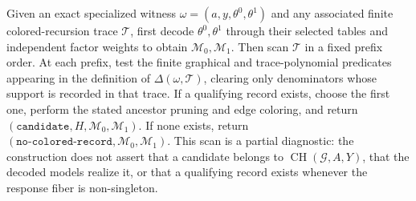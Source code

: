 Given an exact specialized witness \(\omega=(a,y,\theta^0,\theta^1)\) and any associated finite colored-recursion trace \(\mathcal T\), first decode \(\theta^0,\theta^1\) through their selected tables and independent factor weights to obtain \(\mathcal M_0,\mathcal M_1\). Then scan \(\mathcal T\) in a fixed prefix order. At each prefix, test the finite graphical and trace-polynomial predicates appearing in the definition of \(\Delta(\omega,\mathcal T)\), clearing only denominators whose support is recorded in that trace. If a qualifying record exists, choose the first one, perform the stated ancestor pruning and edge coloring, and return \((\mathtt{candidate},H,\mathcal M_0,\mathcal M_1)\). If none exists, return \((\mathtt{no\mbox{-}colored\mbox{-}record},\mathcal M_0,\mathcal M_1)\). This scan is a partial diagnostic: the construction does not assert that a candidate belongs to \(\operatorname{CH}(\mathcal G,A,Y)\), that the decoded models realize it, or that a qualifying record exists whenever the response fiber is non-singleton.